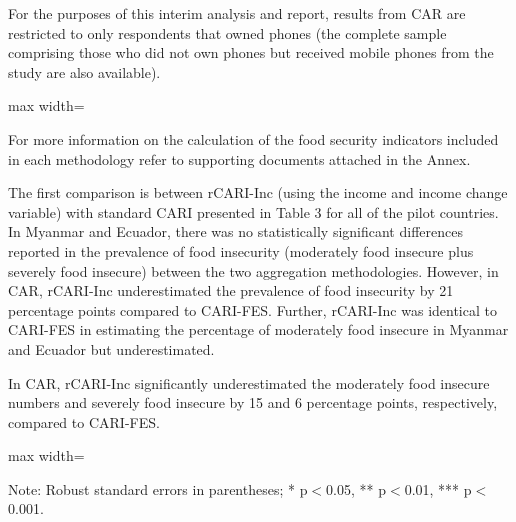\documentclass[11pt,harvard]{article}
\begin{document}
For the purposes of this interim analysis and report, results from  CAR are restricted to only respondents that owned phones (the complete sample comprising those who did not own phones but received mobile phones from the study are  also available).
	
	\begin{table}[htbp]
		\centering
		\begin{adjustbox}{max width=\textwidth}
			\begin{threeparttable}
				\caption{Lists the different aggregation methods and indicators used for each methodology}
				\scriptsize
				 
				\label{tab:Aggregation_Table}
			\end{threeparttable}
		\end{adjustbox}
	\end{table}
	
For more information on the calculation of the food security indicators included in each methodology refer to supporting documents attached in the Annex. 
	
The first comparison is between rCARI-Inc  (using the income and income change variable) with standard CARI presented in Table 3 for all of the pilot countries. In Myanmar and Ecuador, there was no statistically significant differences reported in the prevalence of food insecurity (moderately food insecure plus severely food insecure) between the two aggregation methodologies. However, in CAR, rCARI-Inc underestimated the prevalence of food insecurity by 21 percentage points compared to CARI-FES. Further, rCARI-Inc was identical to CARI-FES in estimating the percentage of moderately food insecure in Myanmar and Ecuador but underestimated. 

In CAR, rCARI-Inc significantly underestimated the moderately food insecure numbers and severely food insecure by 15 and 6 percentage points, respectively, compared to CARI-FES.
	
	\begin{table}[htbp]
		\centering
		\begin{adjustbox}{max width=\textwidth}
			\begin{threeparttable}
				\caption{Impact of Survey Modality: Standard CARI-FES vs. Standard rCARI-Inc}
				\scriptsize
				 
				\label{tab:CARI_rCARI_Modality_All_Country}
				\begin{tablenotes}
					\item Note: Robust standard errors in parentheses; * p$<$0.05, ** p$<$0.01, *** p$<$0.001. 
				\end{tablenotes}
			\end{threeparttable}
		\end{adjustbox}
	\end{table}
	
\end{document}
